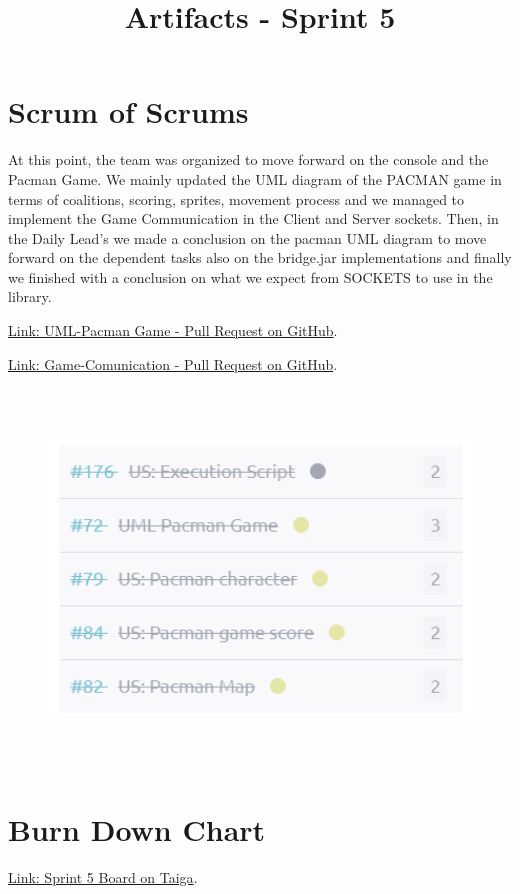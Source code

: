 \documentclass{article}
\title{Artifacts - Sprint 5}
\date{}
\begin{document}
\maketitle

\hypertarget{sos-s3} {
\section{Scrum of Scrums}\label{Scrum of Scrums} 
At this point, the team was organized to move forward on the console and the Pacman Game.
We mainly updated the UML diagram of the PACMAN game in terms of coalitions, scoring, sprites, movement process and we managed to implement the Game Communication in the Client and Server sockets. Then, in the Daily Lead's we made a conclusion on the pacman UML diagram to move forward on the dependent tasks also on the bridge.jar implementations and finally we finished with a conclusion on what we expect from SOCKETS to use in the library. 
}

\href{https://github.com/Pending-Name-21/arquitecture/pull/11}{Link: UML-Pacman Game - Pull Request on GitHub}.

\href{https://github.com/Pending-Name-21/arquitecture/pull/17}{Link: Game-Comunication - Pull Request on GitHub}.

\begin{figure}
\centering
\includegraphics[width=16cm, height=10cm]{./assets/US-Sprint5.png}
\end{figure}

\hypertarget{burndownchart-s3}{
\section{Burn Down Chart}\label{Burn Down Chart S3}}
\href{https://tree.taiga.io/project/joseluis-teran-coffeetime/taskboard/sprint-5-3817}{Link: Sprint 5 Board on Taiga}.
\end{document}
